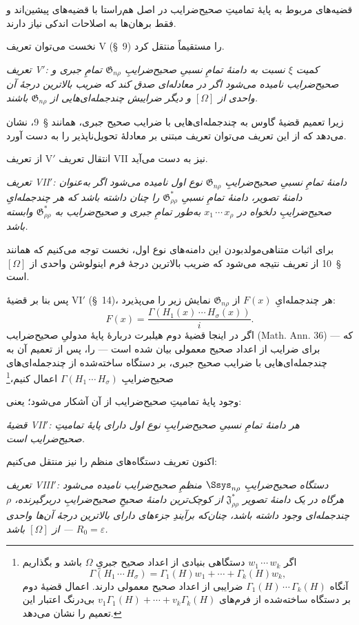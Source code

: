 \documentclass[11pt]{article}
\newcommand{\srcLTR}[1]{\relax\ifmmode\text{\mbox{\babelsublr{\foreignlanguage{english}{#1}}}}\else\babelsublr{\foreignlanguage{english}{#1}}\fi}
\newcommand{\srcfn}[2]{\begingroup\renewcommand{\thefootnote}{\srcLTR{#1}}\footnote{#2}\addtocounter{footnote}{-1}\endgroup}
\providecommand{\Jdom}{\mathfrak{J}}
\providecommand{\Gdom}{\mathfrak{G}}
\providecommand{\rcdots}{\,\cdots\,}
\providecommand{\eps}{\varepsilon}
\begin{document}
قضیه‌های مربوط به پایهٔ تمامیتِ صحیح‌ضرایب در اصل هم‌راستا با قضیه‌های پیشین‌اند و فقط برهان‌ها به اصلاحات اندکی نیاز دارند.

نخست می‌توان تعریف V (\S\ 9) را مستقیماً منتقل کرد.

\emph{تعریف V$'$: کمیت $\xi$ نسبت به دامنهٔ تمامِ نسبیِ صحیح‌ضرایبِ $\Gdom_{n\rho}$ تمامِ جبری و صحیح‌ضرایب نامیده می‌شود اگر در معادله‌ای صدق کند که ضریب بالاترین درجهٔ آن واحدی از $[\Omega]$ و دیگر ضرایبش چندجمله‌ای‌هایی از $\Gdom_{n\rho}$ باشند.}

زیرا تعمیم قضیهٔ گاوس به چندجمله‌ای‌هایی با ضرایب صحیح جبری، همانند \S\ 9، نشان می‌دهد که از این تعریف می‌توان تعریف مبتنی بر معادلهٔ تحویل‌ناپذیر را به دست آورد.

از تعریف V$'$ انتقال تعریف VII نیز به دست می‌آید.

\emph{تعریف VII$'$: دامنهٔ تمامِ نسبیِ صحیح‌ضرایبِ $\Gdom_{n\rho}$ نوع اول نامیده می‌شود اگر به‌عنوان دامنهٔ تصویر، دامنهٔ تمامِ نسبیِ $\Gdom^*_{\rho\rho}$ را چنان داشته باشد که هر چندجمله‌ایِ صحیح‌ضرایبِ دلخواه در $x_1\rcdots x_\rho$ به‌طور تمامِ جبری و صحیح‌ضرایب به $\Gdom^*_{\rho\rho}$ وابسته باشد.}

برای اثبات متناهی‌مولدبودن این دامنه‌های نوع اول، نخست توجه می‌کنیم که همانند \S\ 10 از تعریف نتیجه می‌شود که ضریب بالاترین درجهٔ فرم اینولوشن واحدی از $[\Omega]$ است.

پس بنا بر قضیهٔ VI$'$ (\S\ 14)، هر چندجمله‌ایِ $F(x)$ از $\Gdom_{n\rho}$ نمایش زیر را می‌پذیرد:
\[
  F(x)=\frac{\Gamma(H_1(x)\rcdots H_\sigma(x))}{i}.
\]
اگر در اینجا قضیهٔ دوم هیلبرت دربارهٔ پایهٔ مدولیِ صحیح‌ضرایب (Math. Ann. 36) --- که برای ضرایب از اعداد صحیح معمولی بیان شده است --- را، پس از تعمیم آن به چندجمله‌ای‌هایی با ضرایب صحیح جبری، بر دستگاه ساخته‌شده از چندجمله‌ای‌های صحیح‌ضرایبِ $\Gamma(H_1\rcdots H_\sigma)$ اعمال کنیم،\srcfn{*)}{اگر $w_1\rcdots w_k$ دستگاهی بنیادی از اعداد صحیح جبریِ $\Omega$ باشد و بگذاریم
\[
  \Gamma(H_1\rcdots H_\sigma)=\Gamma_1(H)w_1+\cdots+\Gamma_k(H)w_k,
\]
آنگاه $\Gamma_1(H)\rcdots \Gamma_k(H)$ ضرایبی از اعداد صحیح معمولی دارند. اعمال قضیهٔ دوم بر دستگاه ساخته‌شده از فرم‌های $v_1\Gamma_1(H)+\cdots+v_k\Gamma_k(H)$ بی‌درنگ اعتبار این تعمیم را نشان می‌دهد.} وجود پایهٔ تمامیتِ صحیح‌ضرایب از آن آشکار می‌شود؛ یعنی:

\emph{قضیهٔ VII$'$: هر دامنهٔ تمامِ نسبیِ صحیح‌ضرایبِ نوع اول دارای پایهٔ تمامیتِ صحیح‌ضرایب است.}

اکنون تعریف دستگاه‌های منظم را نیز منتقل می‌کنیم:

\emph{تعریف VIII$'$: دستگاه صحیح‌ضرایبِ $\Ssys_{n\rho}$ منظمِ صحیح‌ضرایب نامیده می‌شود هرگاه در یک دامنهٔ تصویر $\Jdom^*_{\rho\rho}$ از کوچک‌ترین دامنهٔ صحیحِ صحیح‌ضرایبِ دربرگیرنده، $\rho$ چندجمله‌ای وجود داشته باشد، چنان‌که برآیندِ جزءهای دارای بالاترین درجهٔ آن‌ها واحدی از $[\Omega]$ باشد --- $R_0=\eps$.}
\end{document}
